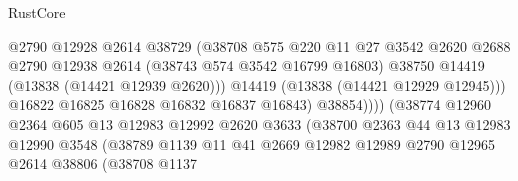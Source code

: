 \begin{lexlean}{RustCore}
\begin{coremodule}
                                          @2790
                                          @12928
                                          @2614
                                          @38729
                                          (@38708
                                            @575
                                            @220
                                            @11
                                            @27
                                            @3542
                                            @2620
                                            @2688
                                            @2790
                                            @12938
                                            @2614
                                            (@38743 @574 @3542 @16799 @16803)
                                            @38750
                                            @14419
                                            (@13838 (@14421 @12939 @2620)))
                                          @14419
                                          (@13838 (@14421 @12929 @12945)))
                                        @16822
                                        @16825
                                        @16828
                                        @16832
                                        @16837
                                        @16843)
                                      @38854))))
                              (@38774
                                @12960
                                @2364
                                @605
                                @13
                                @12983
                                @12992
                                @2620
                                @3633
                                (@38700
                                  @2363
                                  @44
                                  @13
                                  @12983
                                  @12990
                                  @3548
                                  (@38789
                                    @1139
                                    @11
                                    @41
                                    @2669
                                    @12982
                                    @12989
                                    @2790
                                    @12965
                                    @2614
                                    @38806
                                    (@38708
                                      @1137

\end{coremodule}
\end{lexlean}
